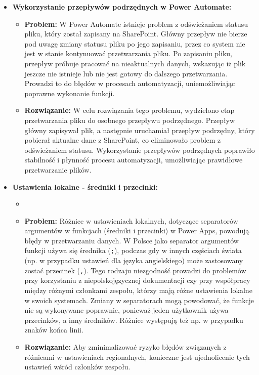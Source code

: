 \begin{itemize}
    \item \textbf{Wykorzystanie przepływów podrzędnych w Power Automate:}
          \begin{itemize}
              \item \textbf{Problem:} W Power Automate istnieje problem z odświeżaniem statusu pliku, który został zapisany na SharePoint. Główny przepływ nie bierze pod uwagę zmiany statusu pliku po jego zapisaniu, przez co system nie jest w stanie kontynuować przetwarzania pliku. Po zapisaniu pliku, przepływ próbuje pracować na nieaktualnych danych, wskazując iż plik jeszcze nie istnieje lub nie jest gotowy do dalszego przetwarzania. Prowadzi to do błędów w procesach automatyzacji, uniemożliwiając poprawne wykonanie funkcji.
              \item \textbf{Rozwiązanie:} W celu rozwiązania tego problemu, wydzielono etap przetwarzania pliku do osobnego przepływu podrzędnego. Przepływ główny zapisywał plik, a następnie uruchamiał przepływ podrzędny, który pobierał aktualne dane z SharePoint, co eliminowało problem z odświeżaniem statusu. Wykorzystanie przepływów podrzędnych poprawiło stabilność i płynność procesu automatyzacji, umożliwiając prawidłowe przetwarzanie plików. 
          \end{itemize}


    \item \textbf{Ustawienia lokalne - średniki i przecinki:}
          \begin{itemize}
            \item {}
              \item \textbf{Problem:} Różnice w ustawieniach lokalnych, dotyczące separatorów argumentów w funkcjach (średniki i przecinki) w Power Apps, powodują błędy w przetwarzaniu danych. W Polsce jako separator argumentów funkcji używa się średnika (\texttt{;}), podczas gdy w innych częściach świata (np. w przypadku ustawień dla języka angielskiego) może zastosowany zostać przecinek (\texttt{,}). Tego rodzaju niezgodność prowadzi do problemów przy korzystaniu z niepolskojęzycznej dokumentacji czy przy współpracy między różnymi członkami zespołu, którzy mają różne ustawienia lokalne w swoich systemach. Zmiany w separatorach mogą powodować, że funkcje nie są wykonywane poprawnie, ponieważ jeden użytkownik używa przecinków, a inny średników. Różnice występują też np. w przypadku znaków końca linii.
              \item \textbf{Rozwiązanie:} Aby zminimalizować ryzyko błędów związanych z różnicami w ustawieniach regionalnych, konieczne jest ujednolicenie tych ustawień wśród członków zespołu.
          \end{itemize}



\end{itemize}
